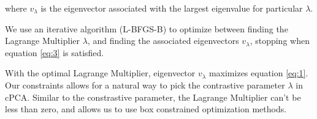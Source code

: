 \documentclass[12pt]{article}
\begin{document}
where $v_\lambda$ is the eigenvector associated with the largest eigenvalue for particular $\lambda$. %


 We use an iterative algorithm (L-BFGS-B) \cite{byrd1995limited} to optimize between finding the Lagrange Multiplier $\lambda$, and finding the associated eigenvectors $v_\lambda$, stopping when equation \ref{eq:3} is satisfied.



With the optimal Lagrange Multiplier, eigenvector $v_\lambda$ maximizes equation \ref{eq:1}.
Our constraints allows for a natural way to pick the contrastive parameter $\lambda$ in cPCA. Similar to the constrastive parameter, the Lagrange Multiplier can't be less than zero, and allows us to use box constrained optimization methods. 


\end{document}
